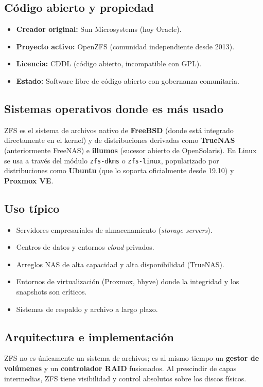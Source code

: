 \documentclass[12pt,letterpaper]{article}
\begin{document}
\subsection{Código abierto y propiedad}
\begin{itemize}
\item \textbf{Creador original:} Sun Microsystems (hoy Oracle).
\item \textbf{Proyecto activo:} OpenZFS (comunidad independiente desde 2013).
\item \textbf{Licencia:} CDDL (código abierto, incompatible con GPL).
\item \textbf{Estado:} Software libre de código abierto con gobernanza comunitaria.
\end{itemize}

\subsection{Sistemas operativos donde es más usado}
ZFS es el sistema de archivos nativo de \textbf{FreeBSD} (donde está integrado directamente en el kernel) y de
distribuciones derivadas como \textbf{TrueNAS} (anteriormente FreeNAS) e \textbf{illumos} (sucesor abierto de
OpenSolaris). En Linux se usa a través del módulo \texttt{zfs-dkms} o \texttt{zfs-linux}, popularizado por
distribuciones como \textbf{Ubuntu} (que lo soporta oficialmente desde 19.10) y \textbf{Proxmox VE}.

\subsection{Uso típico}
\begin{itemize}
\item Servidores empresariales de almacenamiento (\emph{storage servers}).
\item Centros de datos y entornos \emph{cloud} privados.
\item Arreglos NAS de alta capacidad y alta disponibilidad (TrueNAS).
\item Entornos de virtualización (Proxmox, bhyve) donde la integridad y los snapshots son críticos.
\item Sistemas de respaldo y archivo a largo plazo.
\end{itemize}

\subsection{Arquitectura e implementación}
ZFS no es únicamente un sistema de archivos; es al mismo tiempo un \textbf{gestor de volúmenes} y un
\textbf{controlador RAID} fusionados. Al prescindir de capas intermedias, ZFS tiene visibilidad y control
absolutos sobre los discos físicos.
\end{document}
